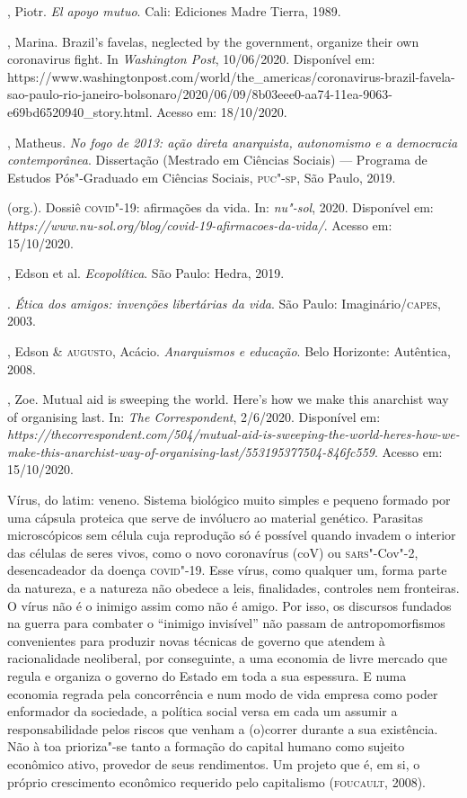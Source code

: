 \begin{bibliohedra}
, Piotr. \emph{El apoyo mutuo}. Cali: Ediciones Madre Tierra,
1989.

, Marina. Brazil's favelas, neglected by the government, organize
their own coronavirus fight. In \emph{Washington Post}, 10/06/2020.
Disponível em:
https://www.washingtonpost.com/world/the\_americas/coronavirus-brazil-favela-sao-paulo-rio-janeiro-bolsonaro/2020/06/09/8b03eee0-aa74-11ea-9063-e69bd6520940\_story.html.
Acesso em: 18/10/2020.

, Matheus. \emph{No fogo de 2013: ação direta anarquista,
autonomismo e a democracia contemporânea}. Dissertação (Mestrado em
Ciências Sociais) --- Programa de Estudos Pós"-Graduado em Ciências
Sociais, \textsc{puc"-sp}, São Paulo, 2019.

 (org.). Dossiê \textsc{covid}"-19: afirmações da vida. In: \emph{nu"-sol},
2020. Disponível em:
\emph{https://www.nu-sol.org/blog/covid-19-afirmacoes-da-vida/}. Acesso
em: 15/10/2020.

, Edson et al. \emph{Ecopolítica}. São Paulo: Hedra, 2019.

\titidem. \emph{Ética dos amigos: invenções libertárias da vida}. São
Paulo: Imaginário/\textsc{capes}, 2003.

, Edson \& \textsc{augusto}, Acácio. \emph{Anarquismos e educação}. Belo
Horizonte: Autêntica, 2008.

, Zoe. Mutual aid is sweeping the world. Here's how we make this
anarchist way of organising last. In: \emph{The Correspondent},
2/6/2020. Disponível em:
\emph{https://thecorrespondent.com/504/mutual-aid-is-sweeping-the-world-heres-how-we-make-this-anarchist-way-of-organising-last/553195377504-846fc559}.
Acesso em: 15/10/2020.
\end{bibliohedra}


Vírus, do latim: veneno. Sistema biológico muito simples e pequeno
formado por uma cápsula proteica que serve de invólucro ao material
genético. Parasitas microscópicos sem célula cuja reprodução só é
possível quando invadem o interior das células de seres vivos, como o
novo coronavírus (coV) ou \textsc{sars}"-Cov"-2, desencadeador da doença \textsc{covid}"-19.
Esse vírus, como qualquer um, forma parte da natureza, e a natureza não
obedece a leis, finalidades, controles nem fronteiras. O vírus não é o
inimigo assim como não é amigo. Por isso, os discursos fundados na
guerra para combater o ``inimigo invisível'' não passam de
antropomorfismos convenientes para produzir novas técnicas de governo
que atendem à racionalidade neoliberal,
por conseguinte, a uma economia de
livre mercado que regula e organiza o governo do Estado em toda a sua
espessura. E numa economia regrada pela concorrência e num modo de vida
empresa como poder enformador da sociedade, a política social versa em
cada um assumir a responsabilidade pelos riscos que venham a (o)correr
durante a sua existência. Não à toa prioriza"-se tanto a formação do
capital humano como sujeito econômico ativo, provedor de seus
rendimentos. Um projeto que é, em si, o próprio crescimento econômico
requerido pelo capitalismo (\textsc{foucault}, 2008).

